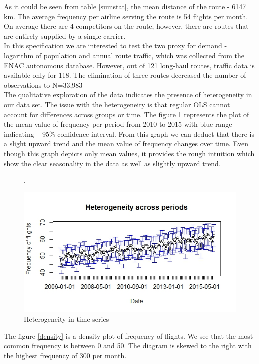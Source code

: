 \documentclass[titlepage, 11pt]{article}
\begin{document}
\tab As it could be seen from table \ref{sumstat}, the mean distance of the route - 6147 km. The average frequency per airline serving the route is 54 flights per month. On average there are 4 competitors on the route, however, there are routes that are entirely supplied by a single carrier. \\
\tab In this specification we are interested to test the two proxy for demand - logarithm of population and annual route traffic, which was collected from the ENAC autonomous database. However, out of 121 long-haul routes, traffic data is available only for 118. The elimination of three routes decreased the number of observations to N=33,983\\ 
\tab The qualitative exploration of the data  indicates the presence of  heterogeneity in our data set. The issue with the heterogeneity is that regular OLS cannot account for differences across groups or time. The figure \ref{hetyears} represents the plot of the mean value of frequency per period from 2010 to 2015 with blue range indicating -- 95\% confidence interval. From this graph we can deduct that there is a slight upward trend and the mean value of frequency changes over time. Even though this graph depicts only mean values, it provides the rough intuition which show the clear seasonality in the data as well as slightly upward trend.
\begin{figure}[ht!]
\centering.
\caption{Heterogeneity in time series}
\label{hetyears}
\includegraphics[scale = 0.5]{Rplot.jpeg}
\end{figure}
\tab The figure \ref{density} is a density plot of frequency of flights. We see that the most common frequency is between 0 and 50. The diagram is skewed to the right with the highest frequency of 300 per month.
\end{document}

